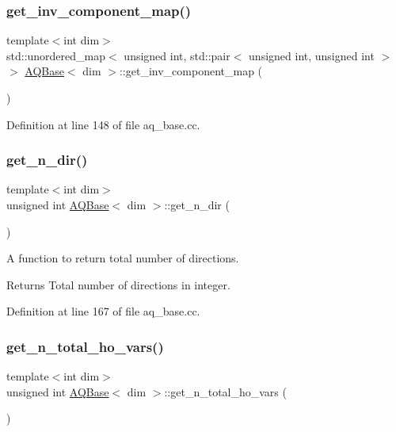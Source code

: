 \subsubsection{\texorpdfstring{get\+\_\+inv\+\_\+component\+\_\+map()}{get\_inv\_component\_map()}}
{\footnotesize\ttfamily template$<$int dim$>$ \\
std\+::unordered\+\_\+map$<$ unsigned int, std\+::pair$<$ unsigned int, unsigned int $>$ $>$ \hyperlink{class_a_q_base}{A\+Q\+Base}$<$ dim $>$\+::get\+\_\+inv\+\_\+component\+\_\+map (\begin{DoxyParamCaption}{ }\end{DoxyParamCaption})}



Definition at line 148 of file aq\+\_\+base.\+cc.

\mbox{\label{class_a_q_base_a803528777761efa898b046e374008744}} 
\subsubsection{\texorpdfstring{get\+\_\+n\+\_\+dir()}{get\_n\_dir()}}
{\footnotesize\ttfamily template$<$int dim$>$ \\
unsigned int \hyperlink{class_a_q_base}{A\+Q\+Base}$<$ dim $>$\+::get\+\_\+n\+\_\+dir (\begin{DoxyParamCaption}{ }\end{DoxyParamCaption})}

A function to return total number of directions.

\begin{DoxyReturn}{Returns}
Total number of directions in integer. 
\end{DoxyReturn}


Definition at line 167 of file aq\+\_\+base.\+cc.

\mbox{\label{class_a_q_base_af367f668495d928c27a985b081868c6c}} 
\subsubsection{\texorpdfstring{get\+\_\+n\+\_\+total\+\_\+ho\+\_\+vars()}{get\_n\_total\_ho\_vars()}}
{\footnotesize\ttfamily template$<$int dim$>$ \\
unsigned int \hyperlink{class_a_q_base}{A\+Q\+Base}$<$ dim $>$\+::get\+\_\+n\+\_\+total\+\_\+ho\+\_\+vars (\begin{DoxyParamCaption}{ }\end{DoxyParamCaption})}



